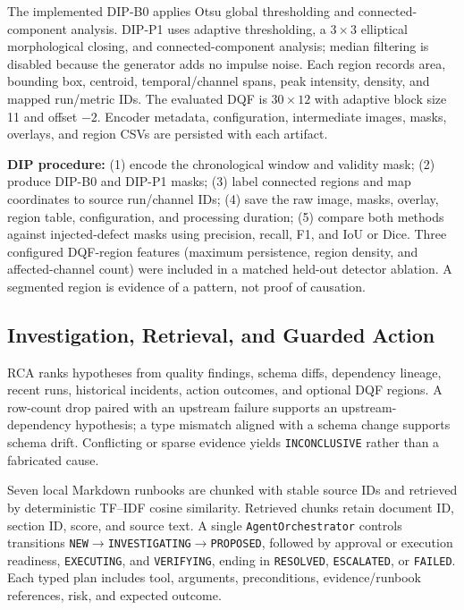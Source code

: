 \documentclass[conference]{IEEEtran}
\begin{document}
The implemented DIP-B0 applies Otsu global thresholding and connected-component analysis. DIP-P1 uses adaptive thresholding, a $3\times3$ elliptical morphological closing, and connected-component analysis; median filtering is disabled because the generator adds no impulse noise. Each region records area, bounding box, centroid, temporal/channel spans, peak intensity, density, and mapped run/metric IDs. The evaluated DQF is $30\times12$ with adaptive block size 11 and offset $-2$. Encoder metadata, configuration, intermediate images, masks, overlays, and region CSVs are persisted with each artifact.

\noindent\textbf{DIP procedure:} (1) encode the chronological window and validity mask; (2) produce DIP-B0 and DIP-P1 masks; (3) label connected regions and map coordinates to source run/channel IDs; (4) save the raw image, masks, overlay, region table, configuration, and processing duration; (5) compare both methods against injected-defect masks using precision, recall, F1, and IoU or Dice. Three configured DQF-region features (maximum persistence, region density, and affected-channel count) were included in a matched held-out detector ablation. A segmented region is evidence of a pattern, not proof of causation.

\subsection{Investigation, Retrieval, and Guarded Action}
RCA ranks hypotheses from quality findings, schema diffs, dependency lineage, recent runs, historical incidents, action outcomes, and optional DQF regions. A row-count drop paired with an upstream failure supports an upstream-dependency hypothesis; a type mismatch aligned with a schema change supports schema drift. Conflicting or sparse evidence yields \texttt{INCONCLUSIVE} rather than a fabricated cause.

Seven local Markdown runbooks are chunked with stable source IDs and retrieved by deterministic TF--IDF cosine similarity. Retrieved chunks retain document ID, section ID, score, and source text. A single \texttt{AgentOrchestrator} controls transitions \texttt{NEW}$\rightarrow$\texttt{INVESTIGATING}$\rightarrow$\texttt{PROPOSED}, followed by approval or execution readiness, \texttt{EXECUTING}, and \texttt{VERIFYING}, ending in \texttt{RESOLVED}, \texttt{ESCALATED}, or \texttt{FAILED}. Each typed plan includes tool, arguments, preconditions, evidence/runbook references, risk, and expected outcome.
\end{document}
